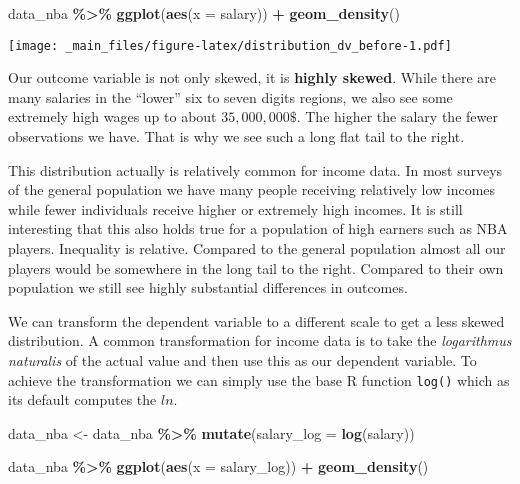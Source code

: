 \documentclass[
]{book}
\newenvironment{Shaded}{\begin{snugshade}}{\end{snugshade}}
\newcommand{\AttributeTok}[1]{\textcolor[rgb]{0.13,0.29,0.53}{#1}}
\newcommand{\FunctionTok}[1]{\textcolor[rgb]{0.13,0.29,0.53}{\textbf{#1}}}
\newcommand{\NormalTok}[1]{#1}
\newcommand{\OtherTok}[1]{\textcolor[rgb]{0.56,0.35,0.01}{#1}}
\newcommand{\SpecialCharTok}[1]{\textcolor[rgb]{0.81,0.36,0.00}{\textbf{#1}}}
\begin{document}
\begin{Shaded}
\begin{Highlighting}[]
\NormalTok{data\_nba }\SpecialCharTok{\%\textgreater{}\%} 
  \FunctionTok{ggplot}\NormalTok{(}\FunctionTok{aes}\NormalTok{(}\AttributeTok{x =}\NormalTok{ salary)) }\SpecialCharTok{+}
  \FunctionTok{geom\_density}\NormalTok{()}
\end{Highlighting}
\end{Shaded}

\texttt{[image: \_main\_files/figure-latex/distribution\_dv\_before-1.pdf]}

Our outcome variable is not only skewed, it is \textbf{highly skewed}. While there
are many salaries in the ``lower'' six to seven digits regions, we also see some
extremely high wages up to about \(35,000,000\$\). The higher the salary the fewer
observations we have. That is why we see such a long flat tail to the right.

This distribution actually is relatively common for income data. In most surveys
of the general population we have many people receiving relatively low incomes
while fewer individuals receive higher or extremely high incomes. It is still
interesting that this also holds true for a population of high earners such as
NBA players. Inequality is relative. Compared to the general
population almost all our players would be somewhere in the long tail to the
right. Compared to their own population we still see highly substantial
differences in outcomes.

We can transform the dependent variable to a different scale to get a less
skewed distribution. A common transformation for income data is to take the
\emph{logarithmus naturalis} of the actual value and then use this as our
dependent variable. To achieve the transformation we can simply use the base R
function \texttt{log()} which as its default computes the \(ln\).

\begin{Shaded}
\begin{Highlighting}[]
\NormalTok{data\_nba }\OtherTok{\textless{}{-}}\NormalTok{ data\_nba }\SpecialCharTok{\%\textgreater{}\%} 
  \FunctionTok{mutate}\NormalTok{(}\AttributeTok{salary\_log =} \FunctionTok{log}\NormalTok{(salary))}

\NormalTok{data\_nba }\SpecialCharTok{\%\textgreater{}\%} 
  \FunctionTok{ggplot}\NormalTok{(}\FunctionTok{aes}\NormalTok{(}\AttributeTok{x =}\NormalTok{ salary\_log)) }\SpecialCharTok{+}
  \FunctionTok{geom\_density}\NormalTok{()}
\end{Highlighting}
\end{Shaded}
\end{document}
